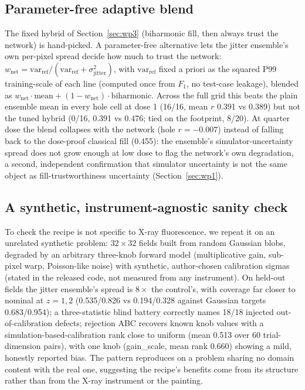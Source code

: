 \documentclass{article}
\newcommand{\Fone}{$F_1$}
\begin{document}
\subsection{Parameter-free adaptive blend}
\label{app:blend}
The fixed hybrid of Section~\ref{sec:wp3} (biharmonic fill, then always trust the network) is hand-picked. A parameter-free alternative lets the jitter ensemble's own per-pixel spread decide how much to trust the network: $w_{\mathrm{net}}=\mathrm{var_{ref}}/(\mathrm{var_{ref}}+\sigma_{\mathrm{jitter}}^2)$, with $\mathrm{var_{ref}}$ fixed a priori as the squared P99 training-scale of each line (computed once from \Fone{}, no test-case leakage), blended as $w_{\mathrm{net}}\cdot\mathrm{mean}+(1-w_{\mathrm{net}})\cdot\mathrm{biharmonic}$. Across the full grid this beats the plain ensemble mean in every hole cell at dose 1 (16/16, mean $r$ 0.391 vs 0.389) but not the tuned hybrid (0/16, 0.391 vs 0.476; tied on the footprint, 8/20). At quarter dose the blend collapses with the network (hole $r=-0.007$) instead of falling back to the dose-proof classical fill (0.455): the ensemble's simulator-uncertainty spread does not grow enough at low dose to flag the network's own degradation, a second, independent confirmation that simulator uncertainty is not the same object as fill-trustworthiness uncertainty (Section~\ref{sec:wp1}).

\subsection{A synthetic, instrument-agnostic sanity check}
\label{app:toy}
To check the recipe is not specific to X-ray fluorescence, we repeat it on an unrelated synthetic problem: $32\times32$ fields built from random Gaussian blobs, degraded by an arbitrary three-knob forward model (multiplicative gain, sub-pixel warp, Poisson-like noise) with synthetic, author-chosen calibration sigmas (stated in the released code, not measured from any instrument). On held-out fields the jitter ensemble's spread is $8\times$ the control's, with coverage far closer to nominal at $z=1,2$ (0.535/0.826 vs 0.194/0.328 against Gaussian targets 0.683/0.954); a three-statistic blind battery correctly names 18/18 injected out-of-calibration defects; rejection ABC recovers known knob values with a simulation-based-calibration rank close to uniform (mean 0.513 over 60 trial-dimension pairs), with one knob (gain\_scale, mean rank 0.660) showing a mild, honestly reported bias. The pattern reproduces on a problem sharing no domain content with the real one, suggesting the recipe's benefits come from its structure rather than from the X-ray instrument or the painting.
\end{document}
